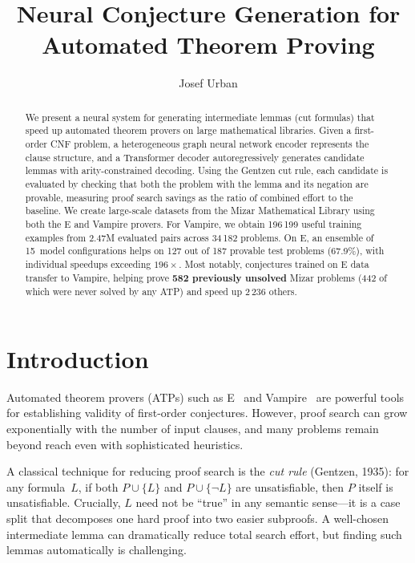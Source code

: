 \documentclass{easychair}
\title{Neural Conjecture Generation for Automated Theorem Proving}
\author{
Josef Urban\inst{1}
}
\institute{
Czech Technical University in Prague
}
\newcommand{\Eprover}{E\xspace}
\newcommand{\Vampire}{Vampire\xspace}
\newcommand{\Mizar}{Mizar\xspace}
\begin{document}
\maketitle

\begin{abstract}
We present a neural system for generating intermediate lemmas
(cut formulas) that speed up automated theorem provers on large
mathematical libraries.  Given a first-order CNF problem, a
heterogeneous graph neural network encoder represents the clause
structure, and a Transformer decoder autoregressively generates
candidate lemmas with arity-constrained decoding.  Using the Gentzen
cut rule, each candidate is evaluated by checking that both the
problem with the lemma and its negation are provable, measuring proof
search savings as the ratio of combined effort to the baseline.  We
create large-scale datasets from the \Mizar Mathematical Library using
both the \Eprover and \Vampire provers.  For \Vampire, we obtain
196\,199 useful training examples from 2.47M evaluated pairs across
34\,182 problems.  On \Eprover, an ensemble of 15~model configurations
helps on 127 out of 187 provable test problems (67.9\%), with
individual speedups exceeding $196\times$.  Most notably,
conjectures trained on \Eprover data transfer to \Vampire, helping
prove \textbf{582 previously unsolved} \Mizar problems (442 of which
were never solved by any ATP) and speed up 2\,236 others.
\end{abstract}

\section{Introduction}
\label{sec:intro}

Automated theorem provers (ATPs) such as \Eprover~\cite{Schulz2002}
and \Vampire~\cite{Kovacs2013} are powerful tools for establishing
validity of first-order conjectures.  However, proof search can grow
exponentially with the number of input clauses, and many problems
remain beyond reach even with sophisticated heuristics.

A classical technique for reducing proof search is the \emph{cut rule}
(Gentzen, 1935): for any formula~$L$, if both $P \cup \{L\}$ and $P
\cup \{\neg L\}$ are unsatisfiable, then $P$ itself is unsatisfiable.
Crucially, $L$ need not be ``true'' in any semantic sense---it is a
case split that decomposes one hard proof into two easier subproofs.
A well-chosen intermediate lemma can dramatically reduce total search
effort, but finding such lemmas automatically is challenging.
\end{document}
